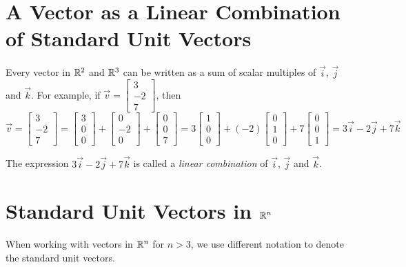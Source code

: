 \documentclass{ximera}
\begin{document}
\section*{A Vector as a Linear Combination of Standard Unit Vectors} 
Every vector in $\mathbb{R}^2$ and $\mathbb{R}^3$ can be written as a sum of scalar multiples of $\vec{i}$, $\vec{j}$ and $\vec{k}$.  For example, if $\vec{v}=\begin{bmatrix}
3\\
-2\\
7
\end{bmatrix}$, then
$$\vec{v}=\begin{bmatrix}
3\\
-2\\
7
\end{bmatrix}=\begin{bmatrix}
3\\
0\\
0
\end{bmatrix}+\begin{bmatrix}
0\\
-2\\
0
\end{bmatrix}+\begin{bmatrix}
0\\
0\\
7
\end{bmatrix}=3\begin{bmatrix}
1\\
0\\
0
\end{bmatrix}+(-2)\begin{bmatrix}
0\\
1\\
0
\end{bmatrix}+7\begin{bmatrix}
0\\
0\\
1
\end{bmatrix}=3\vec{i}-2\vec{j}+7\vec{k}$$

The expression $3\vec{i}-2\vec{j}+7\vec{k}$ is called a {\it linear combination} of $\vec{i}$, $\vec{j}$ and $\vec{k}$. 


\section*{Standard Unit Vectors in $\mathbb{R}^n$}
When working with vectors in $\mathbb{R}^n$ for $n>3$, we use different notation to denote the standard unit vectors.
\end{document}
